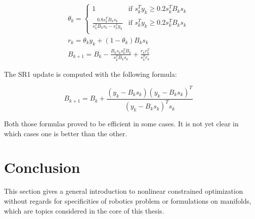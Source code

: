 \begin{equation}
\label{damped_BFGS}
\begin{split}
  \theta_k =
  \left\{
      \begin{array}{ll}
      1 & \text{if } s_k^T y_k \geq 0.2 s_k^T B_k s_k \\
      \frac{0.8 s_k^T B_k s_k}{s_k^T B_k s_k-s_k^T y_k} & \text{if } s_k^T y_k \geq 0.2s_k^T B_k s_k \\
      \end{array}
      \right.\\
      r_k = \theta_k y_k + (1-\theta_k) B_k s_k\\
      B_{k+1} = B_k-\frac{B_k s_k s_k^T B_k}{s_k^T B_k s_k} + \frac{r_k r_k^T}{s_k^T r_k}
\end{split}
\end{equation}

The SR1 update is computed with the following formula:

\begin{equation}
\label{SR1}
B_{k+1} = B_k + \frac{(y_k-B_k s_k){(y_k-B_k s_k)}^T}{{(y_k-B_k s_k)}^T s_k}
\end{equation}

Both those formulas proved to be efficient in some cases. It is not yet clear in which cases one is better than the other.

\section{Conclusion}
This section gives a general introduction to nonlinear constrained optimization without regards for specificities of robotics problem or formulations on manifolds, which are topics considered in the core of this thesis.

